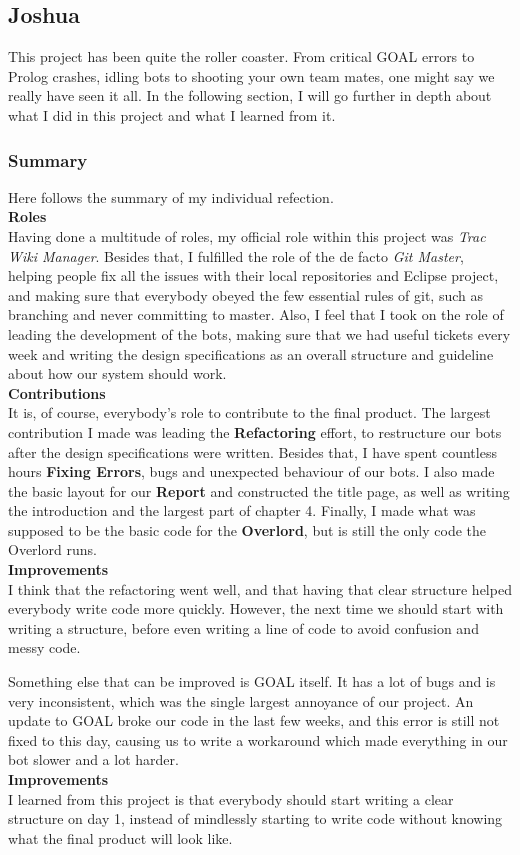\newpage
\subsection{Joshua}
This project has been quite the roller coaster. From critical GOAL errors to Prolog crashes, idling bots to shooting your own team mates, one might say we really have seen it all. In the following section, I will go further in depth about what I did in this project and what I learned from it.
\subsubsection{Summary}
Here follows the summary of my individual refection.
\\[2mm]\noindent
\textbf{Roles}\\
Having done a multitude of roles, my official role within this project was \emph{Trac Wiki Manager}. Besides that, I fulfilled the role of the de facto \emph{Git Master}, helping people fix all the issues with their local repositories and Eclipse project, and making sure that everybody obeyed the few essential rules of git, such as branching and never committing to master. Also, I feel that I took on the role of leading the development of the bots, making sure that we had useful tickets every week and writing the design specifications as an overall structure and guideline about how our system should work.
\\[2mm]\noindent
\textbf{Contributions}\\
It is, of course, everybody's role to contribute to the final product. The largest contribution I made was leading the \textbf{Refactoring} effort, to restructure our bots after the design specifications were written. Besides that, I have spent countless hours \textbf{Fixing Errors}, bugs and unexpected behaviour of our bots. I also made the basic layout for our \textbf{Report} and constructed the title page, as well as writing the introduction and the largest part of chapter 4. Finally, I made what was supposed to be the basic code for the \textbf{Overlord}, but is still the only code the Overlord runs.
\\[2mm]\noindent
\textbf{Improvements}\\
I think that the refactoring went well, and that having that clear structure helped everybody write code more quickly. However, the next time we should start with writing a structure, before even writing a line of code to avoid confusion and messy code.

Something else that can be improved is GOAL itself. It has a lot of bugs and is very inconsistent, which was the single largest annoyance of our project. An update to GOAL broke our code in the last few weeks, and this error is still not fixed to this day, causing us to write a workaround which made everything in our bot slower and a lot harder.
\\[2mm]\noindent
\textbf{Improvements}\\
I learned from this project is that everybody should start writing a clear structure on day 1, instead of mindlessly starting to write code without knowing what the final product will look like.

